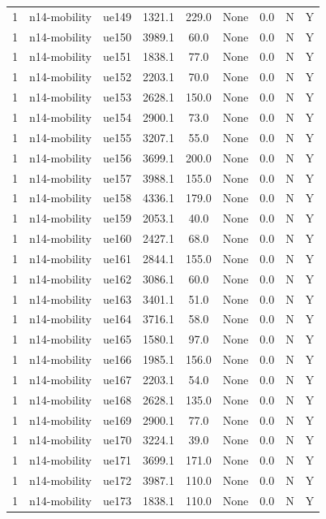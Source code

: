 \begin{table}[ht]
\begin{tabular}{|c|c|c|c|c|c|c|c|c|}
1 & n14-mobility & ue149 & 1321.1 & 229.0 & None & 0.0 & N & Y \\
1 & n14-mobility & ue150 & 3989.1 & 60.0 & None & 0.0 & N & Y \\
1 & n14-mobility & ue151 & 1838.1 & 77.0 & None & 0.0 & N & Y \\
1 & n14-mobility & ue152 & 2203.1 & 70.0 & None & 0.0 & N & Y \\
1 & n14-mobility & ue153 & 2628.1 & 150.0 & None & 0.0 & N & Y \\
1 & n14-mobility & ue154 & 2900.1 & 73.0 & None & 0.0 & N & Y \\
1 & n14-mobility & ue155 & 3207.1 & 55.0 & None & 0.0 & N & Y \\
1 & n14-mobility & ue156 & 3699.1 & 200.0 & None & 0.0 & N & Y \\
1 & n14-mobility & ue157 & 3988.1 & 155.0 & None & 0.0 & N & Y \\
1 & n14-mobility & ue158 & 4336.1 & 179.0 & None & 0.0 & N & Y \\
1 & n14-mobility & ue159 & 2053.1 & 40.0 & None & 0.0 & N & Y \\
1 & n14-mobility & ue160 & 2427.1 & 68.0 & None & 0.0 & N & Y \\
1 & n14-mobility & ue161 & 2844.1 & 155.0 & None & 0.0 & N & Y \\
1 & n14-mobility & ue162 & 3086.1 & 60.0 & None & 0.0 & N & Y \\
1 & n14-mobility & ue163 & 3401.1 & 51.0 & None & 0.0 & N & Y \\
1 & n14-mobility & ue164 & 3716.1 & 58.0 & None & 0.0 & N & Y \\
1 & n14-mobility & ue165 & 1580.1 & 97.0 & None & 0.0 & N & Y \\
1 & n14-mobility & ue166 & 1985.1 & 156.0 & None & 0.0 & N & Y \\
1 & n14-mobility & ue167 & 2203.1 & 54.0 & None & 0.0 & N & Y \\
1 & n14-mobility & ue168 & 2628.1 & 135.0 & None & 0.0 & N & Y \\
1 & n14-mobility & ue169 & 2900.1 & 77.0 & None & 0.0 & N & Y \\
1 & n14-mobility & ue170 & 3224.1 & 39.0 & None & 0.0 & N & Y \\
1 & n14-mobility & ue171 & 3699.1 & 171.0 & None & 0.0 & N & Y \\
1 & n14-mobility & ue172 & 3987.1 & 110.0 & None & 0.0 & N & Y \\
1 & n14-mobility & ue173 & 1838.1 & 110.0 & None & 0.0 & N & Y \\

\end{tabular}
\end{table}

